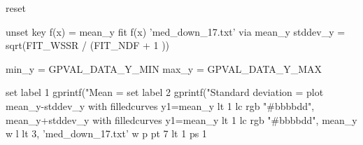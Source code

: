 reset

unset key
f(x) = mean_y
fit f(x) 'med_down_17\ellipseArea.txt' via mean_y
stddev_y = sqrt(FIT_WSSR / (FIT_NDF + 1 ))



min_y = GPVAL_DATA_Y_MIN
max_y = GPVAL_DATA_Y_MAX


set label 1 gprintf("Mean = %
set label 2 gprintf("Standard deviation = %
plot mean_y-stddev_y with filledcurves y1=mean_y lt 1 lc rgb "#bbbbdd", mean_y+stddev_y with filledcurves y1=mean_y lt 1 lc rgb "#bbbbdd", mean_y w l lt 3, 'med_down_17\ellipseArea.txt' w p pt 7 lt 1 ps 1